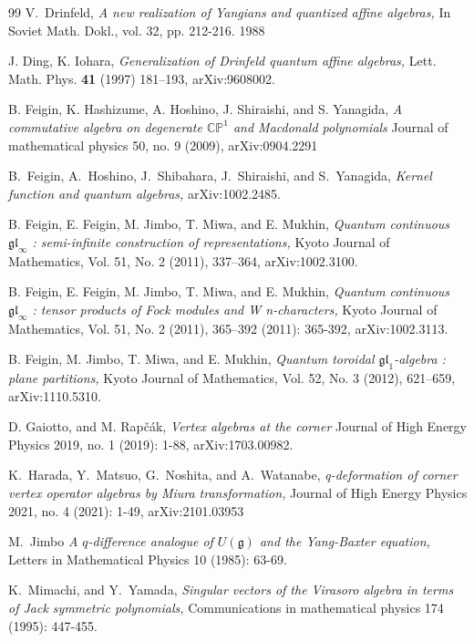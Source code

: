 \documentclass[12pt,reqno,a4paper]{amsart}
\newcommand{\fraks}[1]{\mathfrak{#1}}
\newcommand{\bb}[1]{\mathbb{#1}}
\numberwithin{equation}{section}
\theoremstyle{definition}
\begin{document}
\begin{thebibliography}{99}
V.~Drinfeld, 
{\it A new realization of Yangians and quantized affine algebras,}
In Soviet Math. Dokl., vol. 32, pp. 212-216. 1988

J. Ding, K. Iohara,
{\it Generalization of Drinfeld quantum affine algebras,}		
Lett. Math. Phys. {\bf 41} (1997) 181--193,
arXiv:9608002.

B. Feigin, K. Hashizume, A. Hoshino, J. Shiraishi, and S. Yanagida, 
{\it A commutative algebra on degenerate $\bb{CP}^1$ and Macdonald polynomials}
Journal of mathematical physics 50, no. 9 (2009), 
arXiv:0904.2291

B.~Feigin, A.~Hoshino, J.~Shibahara, J.~Shiraishi, and S.~Yanagida,
{\it Kernel function and quantum algebras,}
arXiv:1002.2485.

B. Feigin, E. Feigin, M. Jimbo, T. Miwa, and E. Mukhin,
{\it Quantum continuous $\fraks{gl}_\infty$ : semi-infinite construction of representations,}
Kyoto Journal of Mathematics, Vol. 51, No. 2 (2011), 337–364, 
arXiv:1002.3100.

B. Feigin, E. Feigin, M. Jimbo, T. Miwa, and E. Mukhin,
{\it Quantum continuous $\fraks{gl}_\infty$ : tensor products of Fock modules and W n-characters,}
Kyoto Journal of Mathematics, Vol. 51, No. 2 (2011), 365–392 (2011): 365-392,
arXiv:1002.3113. 

B. Feigin, M. Jimbo, T. Miwa, and E. Mukhin,
{\it Quantum toroidal $\fraks{gl}_1$-algebra : plane partitions,}
Kyoto Journal of Mathematics, Vol. 52, No. 3 (2012), 621–659, 
arXiv:1110.5310.

D. Gaiotto, and M. Rapčák,
{\it Vertex algebras at the corner}
Journal of High Energy Physics 2019, no. 1 (2019): 1-88,
arXiv:1703.00982. 

K.~Harada, Y.~Matsuo, G.~Noshita, and A.~Watanabe,
{\it q-deformation of corner vertex operator algebras by Miura transformation,}
Journal of High Energy Physics 2021, no. 4 (2021): 1-49, 
arXiv:2101.03953

M.~Jimbo
{\it A $q$-difference analogue of $U(\fraks{g})$ and the Yang-Baxter equation,}
Letters in Mathematical Physics 10 (1985): 63-69.

K.~Mimachi, and Y.~Yamada,
{\it Singular vectors of the Virasoro algebra in terms of Jack symmetric polynomials,}
Communications in mathematical physics 174 (1995): 447-455.
		

\end{thebibliography}
\end{document}
